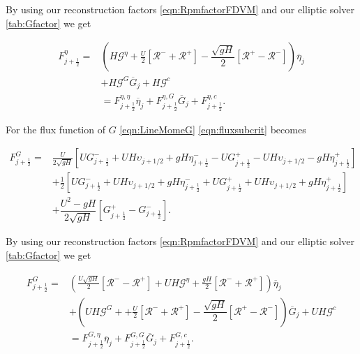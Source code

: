 By using our reconstruction factors \eqref{eqn:RpmfactorFDVM} and our elliptic solver \eqref{tab:Gfactor} we get

\begin{align}
F^\eta_{j+\frac{1}{2}} = &\left(H\mathcal{G}^{\eta}  + \frac{U}{2}\left[ \mathcal{R}^- +  \mathcal{R}^+\right]- \dfrac{\sqrt{gH}}{2} \left [ \mathcal{R}^+ - \mathcal{R}^- \right ] \right) \overline{\eta}_j \nonumber \\  &+ H\mathcal{G}^G \overline{G}_{j} + H \mathcal{G}^c \nonumber \\ &= F^{\eta, \eta}_{j+\frac{1}{2}} \overline{\eta}_{j} + F^{\eta, G}_{j+\frac{1}{2}} \overline{G}_{j} + F^{\eta, c}_{j+\frac{1}{2}} .
\label{eqn:Fluxfactorsubcriteta}
\end{align}

For the flux function of $G$ \eqref{eqn:LineMomeG} \eqref{eqn:fluxsubcrit} becomes

\begin{align}
F^G_{j+\frac{1}{2}} = &\frac{U}{2 \sqrt{gH}} \left[ UG^-_{j+\frac{1}{2}} + UH \upsilon_{j+1/2} + gH\eta^-_{j+\frac{1}{2}} - UG^+_{j+\frac{1}{2}} - UH \upsilon_{j+1/2} - gH\eta^+_{j+\frac{1}{2}}  \right]   \nonumber \\ &+ \frac{1}{2}\left[UG^-_{j+\frac{1}{2}} + UH \upsilon_{j+1/2} + gH\eta^-_{j+\frac{1}{2}} + UG^+_{j+\frac{1}{2}} + UH \upsilon_{j+1/2} + gH\eta^+_{j+\frac{1}{2}}\right] \nonumber \\ &+ \dfrac{U^2 - gH}{2\sqrt{g H}} \left [ G^+_{j+\frac{1}{2}} - G^-_{j+\frac{1}{2}} \right ].
\end{align}

By using our reconstruction factors \eqref{eqn:RpmfactorFDVM} and our elliptic solver \eqref{tab:Gfactor} we get

\begin{align}
F^G_{j+\frac{1}{2}} =  &\left(\frac{U\sqrt{gH}}{2} \left[ \mathcal{R}^- - \mathcal{R}^+  \right] + UH\mathcal{G}^{\eta} + \frac{gH}{2} \left[ \mathcal{R}^- +\mathcal{R}^+ \right]   \right)\overline{\eta}_j \nonumber \\ &+ \left(UH\mathcal{G}^{G} + + \frac{U}{2} \left[ \mathcal{R}^- +\mathcal{R}^+ \right] - \dfrac{\sqrt{g H}}{2} \left [\mathcal{R}^+ - \mathcal{R}^- \right ]   \right) \overline{G}_j + UH\mathcal{G}^{c}  \nonumber \\
& = F^{G, \eta}_{j+\frac{1}{2}} \overline{\eta}_{j} + F^{G, G}_{j+\frac{1}{2}} \overline{G}_{j} + F^{G, c}_{j+\frac{1}{2}}   .
\label{eqn:FluxfactorsubcritG}
\end{align}




